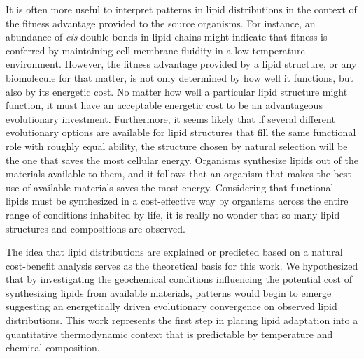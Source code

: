 It is often more useful to interpret patterns in lipid distributions in the context of the fitness advantage provided to the source organisms. For instance, an abundance of \textit{cis}-double bonds in lipid chains might indicate that fitness is conferred by maintaining cell membrane fluidity in a low-temperature environment. However, the fitness advantage provided by a lipid structure, or any biomolecule for that matter, is not only determined by how well it functions, but also by its energetic cost. No matter how well a particular lipid structure might function, it must have an acceptable energetic cost to be an advantageous evolutionary investment. Furthermore, it seems likely that if several different evolutionary options are available for lipid structures that fill the same functional role with roughly equal ability, the structure chosen by natural selection will be the one that saves the most cellular energy. Organisms synthesize lipids out of the materials available to them, and it follows that an organism that makes the best use of available materials saves the most energy. Considering that functional lipids must be synthesized in a cost-effective way by organisms across the entire range of conditions inhabited by life, it is really no wonder that so many lipid structures and compositions are observed. 

The idea that lipid distributions are explained or predicted based on a natural cost-benefit analysis serves as the theoretical basis for this work. We hypothesized that by investigating the geochemical conditions influencing the potential cost of synthesizing lipids from available materials, patterns would begin to emerge suggesting an energetically driven evolutionary convergence on observed lipid distributions. This work represents the first step in placing lipid adaptation into a quantitative thermodynamic context that is predictable by temperature and chemical composition.

